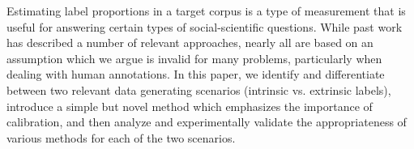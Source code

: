 Estimating label proportions in a target corpus is a type of measurement that is useful for answering certain types of social-scientific questions. While past work has described a number of relevant approaches, nearly all are based on an assumption which we argue is invalid for many problems, particularly when dealing with human annotations. In this paper, we identify and differentiate between two relevant data generating scenarios (intrinsic vs. extrinsic labels), introduce a simple but novel method which emphasizes the importance of calibration, and then analyze and experimentally validate the appropriateness of various methods for each of the two scenarios.

